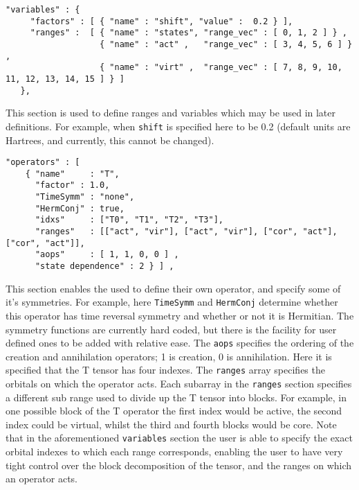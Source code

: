\begin{lstlisting}[label={lst:variables}]
  "variables" : {
     "factors" : [ { "name" : "shift", "value" :  0.2 } ],
     "ranges" :  [ { "name" : "states", "range_vec" : [ 0, 1, 2 ] } ,
                   { "name" : "act" ,   "range_vec" : [ 3, 4, 5, 6 ] } ,
                   { "name" : "virt" ,  "range_vec" : [ 7, 8, 9, 10, 11, 12, 13, 14, 15 ] } ]
   },
\end{lstlisting}         
\noindent This section is used to define ranges and variables which may be used in later definitions. For example,
when \texttt{shift} is specified here to be 0.2 (default units are Hartrees, and currently, this cannot be 
changed). 

\begin{lstlisting}[label={lst:operators}]
  "operators" : [
    { "name"     : "T",
      "factor" : 1.0,
      "TimeSymm" : "none",
      "HermConj" : true,
      "idxs"     : ["T0", "T1", "T2", "T3"],
      "ranges"   : [["act", "vir"], ["act", "vir"], ["cor", "act"], ["cor", "act"]],
      "aops"     : [ 1, 1, 0, 0 ] ,
      "state dependence" : 2 } ] ,
\end{lstlisting}         
\noindent This section enables the used to define their own operator, and
specify some of it's symmetries. For example, here \texttt{TimeSymm} and
\texttt{HermConj} determine whether this operator has time reversal symmetry 
and whether or not it is Hermitian. The symmetry functions are 
currently hard coded, but there is the facility for user defined ones
to be added with relative ease.
 The \texttt{aops} specifies the ordering of the   
creation and annihilation operators; 1 is creation, 0 is annihilation.  Here it
is specified that the T tensor has four indexes. The \texttt{ranges} array specifies the
orbitals on which the operator acts.  Each subarray in the \texttt{ranges} section
specifies a different sub range used to divide up the T tensor into blocks.
For example, in one possible block of the T operator the first index would be
active, the second index could be virtual, whilst the third and fourth blocks
would be core.  Note that in the aforementioned \texttt{variables} section the user is
able to specify the exact orbital indexes to which each range corresponds,
enabling the user to have very tight control over the block decomposition of
the tensor, and the ranges on which an operator acts. 

